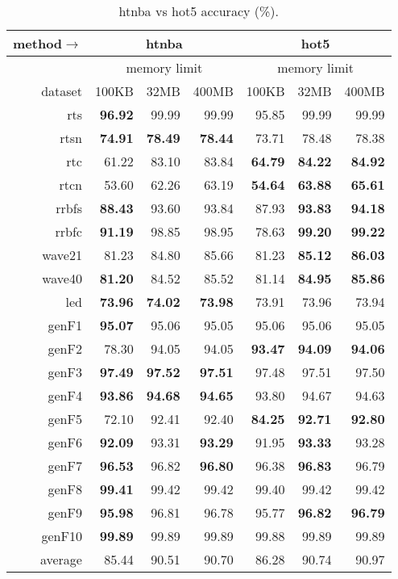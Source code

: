 \begin{table}
\caption{{\sc htnba} vs {\sc hot5} accuracy (\%).}
\label{tab:htnba_vs_hot5}
\centering
\begin{tabular}{|r||r|r|r||r|r|r|}
\hline
method$\rightarrow$ & \multicolumn{3}{|c||}{{\sc htnba}} & \multicolumn{3}{|c|}{{\sc hot5}} \\
\hline
 & \multicolumn{3}{|c||}{memory limit} & \multicolumn{3}{|c|}{memory limit} \\
\hline
dataset & 100KB & 32MB & 400MB & 100KB & 32MB & 400MB \\
\hline
{\sc rts} & \textbf{96.92} & 99.99 & 99.99 & 95.85 & 99.99 & 99.99 \\
{\sc rtsn} & \textbf{74.91} & \textbf{78.49} & \textbf{78.44} & 73.71 & 78.48 & 78.38 \\
{\sc rtc} & 61.22 & 83.10 & 83.84 & \textbf{64.79} & \textbf{84.22} & \textbf{84.92} \\
{\sc rtcn} & 53.60 & 62.26 & 63.19 & \textbf{54.64} & \textbf{63.88} & \textbf{65.61} \\
{\sc rrbfs} & \textbf{88.43} & 93.60 & 93.84 & 87.93 & \textbf{93.83} & \textbf{94.18} \\
{\sc rrbfc} & \textbf{91.19} & 98.85 & 98.95 & 78.63 & \textbf{99.20} & \textbf{99.22} \\
{\sc wave21} & 81.23 & 84.80 & 85.66 & 81.23 & \textbf{85.12} & \textbf{86.03} \\
{\sc wave40} & \textbf{81.20} & 84.52 & 85.52 & 81.14 & \textbf{84.95} & \textbf{85.86} \\
{\sc led} & \textbf{73.96} & \textbf{74.02} & \textbf{73.98} & 73.91 & 73.96 & 73.94 \\
{\sc genF1} & \textbf{95.07} & 95.06 & 95.05 & 95.06 & 95.06 & 95.05 \\
{\sc genF2} & 78.30 & 94.05 & 94.05 & \textbf{93.47} & \textbf{94.09} & \textbf{94.06} \\
{\sc genF3} & \textbf{97.49} & \textbf{97.52} & \textbf{97.51} & 97.48 & 97.51 & 97.50 \\
{\sc genF4} & \textbf{93.86} & \textbf{94.68} & \textbf{94.65} & 93.80 & 94.67 & 94.63 \\
{\sc genF5} & 72.10 & 92.41 & 92.40 & \textbf{84.25} & \textbf{92.71} & \textbf{92.80} \\
{\sc genF6} & \textbf{92.09} & 93.31 & \textbf{93.29} & 91.95 & \textbf{93.33} & 93.28 \\
{\sc genF7} & \textbf{96.53} & 96.82 & \textbf{96.80} & 96.38 & \textbf{96.83} & 96.79 \\
{\sc genF8} & \textbf{99.41} & 99.42 & 99.42 & 99.40 & 99.42 & 99.42 \\
{\sc genF9} & \textbf{95.98} & 96.81 & 96.78 & 95.77 & \textbf{96.82} & \textbf{96.79} \\
{\sc genF10} & \textbf{99.89} & 99.89 & 99.89 & 99.88 & 99.89 & 99.89 \\
\hline
average & 85.44 & 90.51 & 90.70 & 86.28 & 90.74 & 90.97 \\
\hline
\end{tabular}
\end{table}


